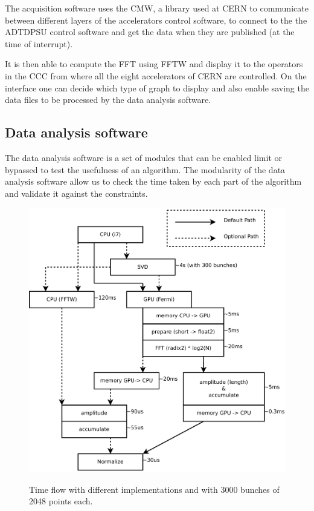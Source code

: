 	The acquisition software uses the \gls{CMW}, a library used at \gls{CERN} to communicate between different layers of the accelerators control software, to connect to the the ADTDPSU control software and get the data when they are published (at the time of interrupt).

	It is then able to compute the \gls{FFT} using \gls{FFTW} and display it to the operators in the \gls{CCC} from where all the eight accelerators of \gls{CERN} are controlled. On the interface one can decide which type of graph to display and also enable saving the data files to be processed by the data analysis software.

	\subsection{Data analysis software}
	\label{sec:data_analysis_software}

	The data analysis software is a set of modules that can be enabled limit or bypassed to test the usefulness of an algorithm. The modularity of the data analysis software allow us to check the time taken by each part of the algorithm and validate it against the constraints.

	\begin{figure}[H]
	\caption{Time f\/low with different implementations and with 3000 bunches of 2048 points each.}
	\centering
	\includegraphics[scale=0.3]{PC-flow.pdf}
	\label{fig:PCFlow}
	\end{figure}

